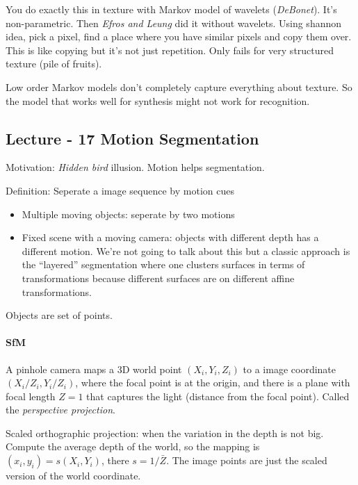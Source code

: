 You do exactly this in texture with Markov model of wavelets
(\emph{DeBonet}). It's non-parametric. Then \emph{Efros and Leung} did
it without wavelets. Using shannon idea, pick a pixel, find a place where you have
similar pixels and copy them over. This is like copying but it's not
just repetition. Only fails for very structured texture (pile of
fruits).

Low order Markov models don't completely capture everything about
texture. So the model that works well for synthesis might not work for recognition.

\pagebreak

\subsection{Lecture - 17 Motion Segmentation}
\label{sec:lecture-17}
Motivation: \emph{Hidden bird} illusion. Motion helps segmentation. 

Definition: Seperate a image sequence by motion cues
\begin{itemize}
\item Multiple moving objects: seperate by two motions
\item Fixed scene with a moving camera: objects with different depth
  has a different motion. We're not going to talk about this but a
  classic approach is the ``layered'' segmentation where one clusters
  surfaces in terms of transformations because different surfaces are on different affine
  transformations.
\end{itemize}
Objects are set of points. 

\paragraph{SfM}
\label{sec:sfm}
A pinhole camera maps a 3D world point $(X_i,Y_i,Z_i)$ to a image coordinate
$(X_i/Z_i, Y_i/Z_i)$, where the focal point is at the origin,
and there is a plane with focal length $Z=1$ that captures the light (distance from the focal
point). Called the \emph{perspective projection}.

Scaled orthographic projection: when the variation in the depth is
not big. Compute the average depth of the world, so the mapping is
$(x_i, y_i) = s(X_i, Y_i)$, there $s= 1/\bar Z$. The image points are
just the scaled version of the world coordinate. 

